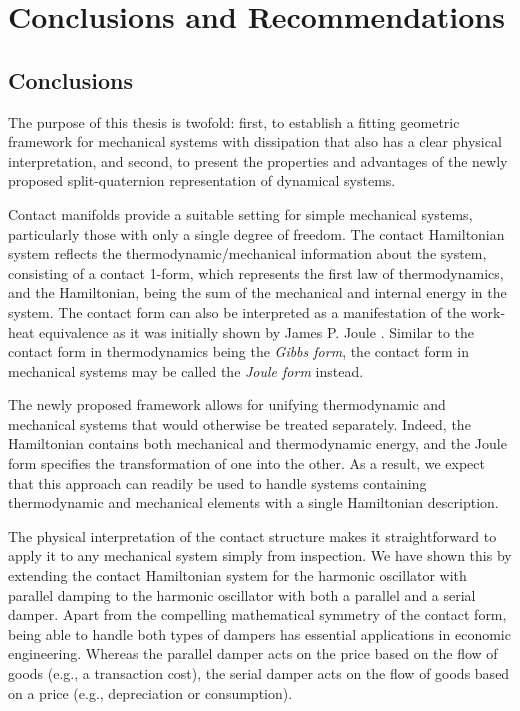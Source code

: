 \chapter{Conclusions and Recommendations}
\label{chap:conclusion}

\section*{Conclusions}
The purpose of this thesis is twofold: first, to establish a fitting geometric framework for mechanical systems with dissipation that also has a clear physical interpretation, and second, to present the properties and advantages of the newly proposed split-quaternion representation of dynamical systems. 

Contact manifolds provide a suitable setting for simple mechanical systems, particularly those with only a single degree of freedom. The contact Hamiltonian system reflects the thermodynamic/mechanical information about the system, consisting of a contact 1-form, which represents the first law of thermodynamics, and the Hamiltonian, being the sum of the mechanical and internal energy in the system. The contact form can also be interpreted as a manifestation of the work-heat equivalence as it was initially shown by James P. Joule \cite{joule1850}. Similar to the contact form in thermodynamics being the \emph{Gibbs form}, the contact form in mechanical systems may be called the \emph{Joule form} instead. 

The newly proposed framework allows for unifying thermodynamic and mechanical systems that would otherwise be treated separately. Indeed, the Hamiltonian contains both mechanical and thermodynamic energy, and the Joule form specifies the transformation of one into the other. As a result, we expect that this approach can readily be used to handle systems containing thermodynamic and mechanical elements with a single Hamiltonian description.

The physical interpretation of the contact structure makes it straightforward to apply it to any mechanical system simply from inspection. We have shown this by extending the contact Hamiltonian system for the harmonic oscillator with parallel damping to the harmonic oscillator with both a parallel and a serial damper. Apart from the compelling mathematical symmetry of the contact form, being able to handle both types of dampers has essential applications in economic engineering. Whereas the parallel damper acts on the price based on the flow of goods (e.g., a transaction cost), the serial damper acts on the flow of goods based on a price (e.g., depreciation or consumption).

